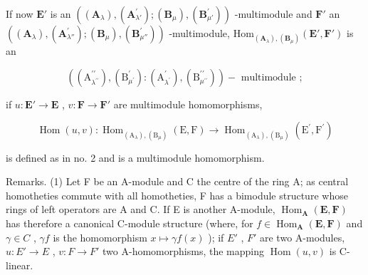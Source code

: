 If now \(\mathbf{E}'\) is an \(((\mathbf{A}_{\lambda}), (\mathbf{A}_{\lambda'}^{\prime}) ; (\mathbf{B}_{\mu}), (\mathbf{B}_{\mu'}^{\prime}))\) -multimodule and \(\mathbf{F}'\) an \(((\mathbf{A}_{\lambda}), (\mathbf{A}_{\lambda''}^{\prime}) ; (\mathbf{B}_{\mu}), (\mathbf{B}_{\mu''}^{\prime}))\) -multimodule, \(\mathrm{Hom}_{(\mathbf{A}_{\lambda}), (\mathbf{B}_{\mu})}(\mathbf{E}', \mathbf{F}')\) is an

\[
\left(\left(\mathrm{A} _ {\lambda^ {\prime \prime}} ^ {\prime \prime}\right), \left(\mathrm{B} _ {\mu^ {\prime}} ^ {\prime}\right): \left(\mathrm{A} _ {\lambda^ {\prime}} ^ {\prime}\right), \left(\mathrm{B} _ {\mu^ {\prime \prime}} ^ {\prime \prime}\right)\right) - \text { multimodule };
\]

if \(u: \mathbf{E}' \to \mathbf{E}\) , \(v: \mathbf{F} \to \mathbf{F}'\) are multimodule homomorphisms,

\[
\operatorname{Hom} (u, v): \operatorname{Hom} _ {\left(\mathrm{A} _ {\lambda}\right), \left(\mathrm{B} _ {\mu}\right)} (\mathrm{E}, \mathrm{F}) \rightarrow \operatorname{Hom} _ {\left(\mathrm{A} _ {\lambda}\right), \left(\mathrm{B} _ {\mu}\right)} \left(\mathrm{E} ^ {\prime}, \mathrm{F} ^ {\prime}\right)
\]

is defined as in no. 2 and is a multimodule homomorphism.

Remarks. (1) Let F be an A-module and C the centre of the ring A; as central homotheties commute with all homotheties, F has a bimodule structure whose rings of left operators are A and C. If E is another A-module, \(\operatorname{Hom}_{\mathbf{A}}(\mathbf{E}, \mathbf{F})\) has therefore a canonical C-module structure (where, for \(f \in \operatorname{Hom}_{\mathbf{A}}(\mathbf{E}, \mathbf{F})\) and \(\gamma \in C\) , \(\gamma f\) is the homomorphism \(x \mapsto \gamma f(x)\) ); if \(E'\) , \(F'\) are two A-modules, \(u: E' \to E\) , \(v: F \to F'\) two A-homomorphisms, the mapping \(\operatorname{Hom}(u, v)\) is C-linear.

